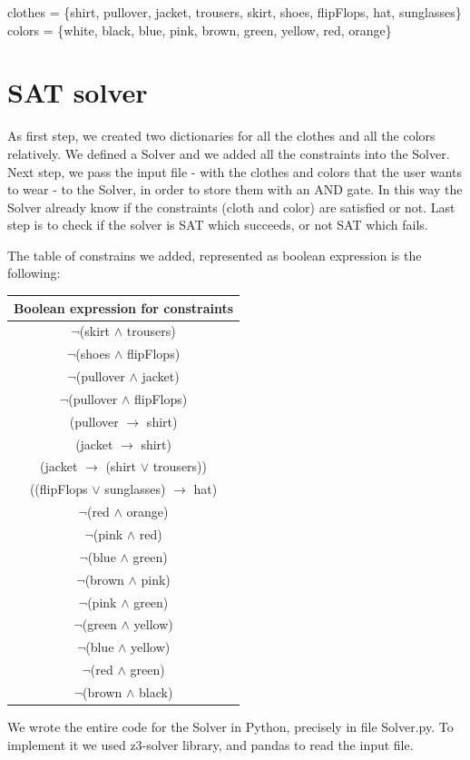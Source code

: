 \documentclass[12pt]{article}
\begin{document}
\begin{center}
	clothes = \{shirt, pullover, jacket, trousers, skirt, shoes, flipFlops, hat, sunglasses\}\\
	colors = \{white, black, blue, pink, brown, green, yellow, red, orange\}
\end{center}


\section{SAT solver}

As first step, we created two dictionaries for all the clothes and all the colors relatively. We defined a Solver and we added all the constraints into the Solver. Next step, we pass the input file - with the clothes and colors that the user wants to wear - to the Solver, in order to store them with an AND gate. In this way the Solver already know if the constraints (cloth and color) are satisfied or not. Last step is to check if the solver is SAT which succeeds, or not SAT which fails.  

The table of constrains we added, represented as boolean expression is the following:


\begin{center}
\begin{tabular}{|c|}
\hline
Boolean expression for constraints \\[0.1cm]
\hline 
$\neg$(skirt $\wedge$ trousers) \\[0.2cm]
$\neg$(shoes $\wedge$ flipFlops) \\[0.2cm]
$\neg$(pullover $\wedge$ jacket) \\[0.2cm]
$\neg$(pullover $\wedge$ flipFlops) \\[0.2cm]

(pullover $\rightarrow$ shirt) \\[0.2cm]
(jacket $\rightarrow$ shirt) \\[0.2cm]
(jacket $\rightarrow$ (shirt $\lor$ trousers)) \\[0.2cm]
((flipFlops $\lor$ sunglasses)  $\rightarrow$ hat)\\[0.2cm]
$\neg$(red $\wedge$ orange) \\[0.2cm]
$\neg$(pink $\wedge$ red) \\[0.2cm]
$\neg$(blue $\wedge$ green) \\[0.2cm]
$\neg$(brown $\wedge$ pink) \\[0.2cm]
$\neg$(pink $\wedge$ green) \\[0.2cm]
$\neg$(green $\wedge$ yellow) \\[0.2cm]
$\neg$(blue $\wedge$ yellow) \\[0.2cm]
$\neg$(red $\wedge$ green) \\[0.2cm]
$\neg$(brown $\wedge$ black) \\[0.2cm]

\hline
\end{tabular}
\end{center}

We wrote the entire code for the Solver in Python, precisely in file Solver.py. To implement it we used z3-solver library, and pandas to read the input file. 
\end{document}
